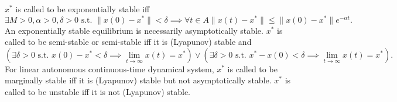 \documentclass[a4paper,12pt]{report}
\begin{document}
$x^*$ is called to be exponentially stable iff
\[\exists M>0,\alpha>0,\delta>0\text{\ s.t.\ }\|x(0)-x^*\|<\delta\implies\forall t\in A\|x(t)-x^*\|\leq\|x(0)-x^*\|e^{-\alpha t}.\]
An exponentially stable equilibrium is necessarily asymptotically stable.
$x^*$ is called to be semi-stable or semi-stable iff it is (Lyapunov) stable and
\[(\exists\delta>0\text{\ s.t.\ }x(0)-x^*<\delta\implies\lim_{t\to\infty}x(t)=x^*)\lor (\exists\delta>0\text{\ s.t.\ }x^*-x(0)<\delta\implies\lim_{t\to\infty}x(t)=x^*).\]
For linear autonomous continuous-time dynamical system, $x^*$ is called to be marginally stable iff it is (Lyapunov) stable but not asymptotically stable.
$x^*$ is called to be unstable iff it is not (Lyapunov) stable.
\end{document}
